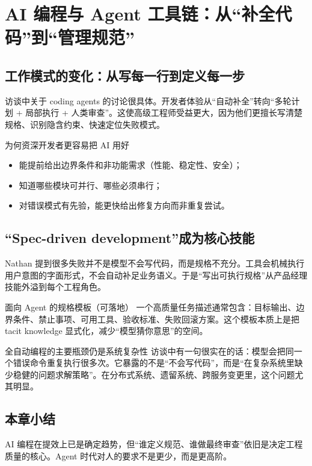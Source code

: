 \section{AI 编程与 Agent 工具链：从“补全代码”到“管理规范”}

\subsection{工作模式的变化：从写每一行到定义每一步}

访谈中关于 coding agents 的讨论很具体。开发者体验从“自动补全”转向“多轮计划 + 局部执行 + 人类审查”。这使高级工程师受益更大，因为他们更擅长写清楚规格、识别隐含约束、快速定位失败模式。

\begin{importantbox}{为何资深开发者更容易把 AI 用好}
\begin{itemize}[leftmargin=1.5em]
    \item 能提前给出边界条件和非功能需求（性能、稳定性、安全）；
    \item 知道哪些模块可并行、哪些必须串行；
    \item 对错误模式有先验，能更快给出修复方向而非重复尝试。
\end{itemize}
\end{importantbox}

\subsection{“Spec-driven development”成为核心技能}

Nathan 提到很多失败并不是模型不会写代码，而是规格不充分。工具会机械执行用户意图的字面形式，不会自动补足业务语义。于是“写出可执行规格”从产品经理技能外溢到每个工程角色。

\begin{knowledgebox}{面向 Agent 的规格模板（可落地）}
一个高质量任务描述通常包含：目标输出、边界条件、禁止事项、可用工具、验收标准、失败回滚方案。这个模板本质上是把 tacit knowledge 显式化，减少“模型猜你意思”的空间。
\end{knowledgebox}

\begin{warningbox}{全自动编程的主要瓶颈仍是系统复杂性}
访谈中有一句很实在的话：模型会把同一个错误命令重复执行很多次。它暴露的不是“不会写代码”，而是“在复杂系统里缺少稳健的问题求解策略”。在分布式系统、遗留系统、跨服务变更里，这个问题尤其明显。
\end{warningbox}

\subsection{本章小结}

AI 编程在提效上已是确定趋势，但“谁定义规范、谁做最终审查”依旧是决定工程质量的核心。Agent 时代对人的要求不是更少，而是更高阶。

